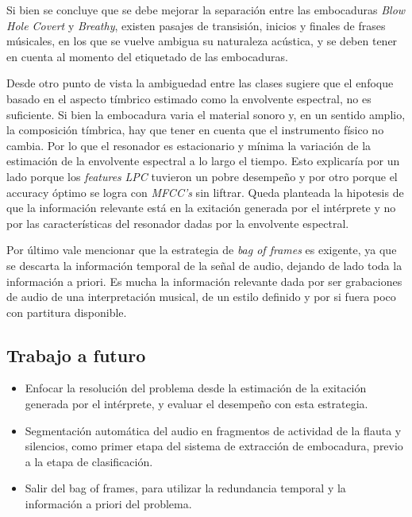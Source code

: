 \documentclass{article}
\begin{document}
Si bien se concluye que se debe mejorar la separación entre las embocaduras \textit{Blow Hole Covert} y \textit{Breathy}, existen pasajes de transisión, inicios y finales de frases músicales, en los que se vuelve ambigua su naturaleza acústica, y se deben tener en cuenta al momento del etiquetado de las embocaduras. 

\medskip

Desde otro punto de vista la ambiguedad entre las clases sugiere que el enfoque basado en el aspecto tímbrico estimado como la envolvente espectral, no es suficiente. Si bien la embocadura varia el material sonoro y, en un sentido amplio, la composición tímbrica, hay que tener en cuenta que el instrumento físico no cambia. Por lo que el resonador es estacionario y mínima la variación de la estimación de la envolvente espectral a lo largo el tiempo. Esto explicaría por un lado porque los \textit{features} \textit{LPC} tuvieron un pobre desempeño y por otro porque el accuracy óptimo se logra con \textit{MFCC's} sin liftrar. Queda planteada la hipotesis de que la información relevante está en la exitación generada por el intérprete y no por las características del resonador dadas por la envolvente espectral.

\medskip

Por último vale mencionar que la estrategia de \textit{bag of frames} es exigente, ya que se descarta la información temporal de la señal de audio, dejando de lado toda la información a priori. Es mucha la información relevante dada por ser grabaciones de audio de una interpretación musical, de un estilo definido y por si fuera poco con partitura disponible. 


\subsection{Trabajo a futuro}

\begin{itemize} 

  \item Enfocar la resolución del problema desde la estimación de la exitación generada por el intérprete, y evaluar el desempeño con esta estrategia.
  
  \item Segmentación automática del audio en fragmentos de actividad de la flauta y silencios, como primer etapa del sistema de extracción de embocadura, previo a la etapa de clasificación.
   
  \item Salir del bag of frames, para utilizar la redundancia temporal y la información a priori del problema.

\end{itemize}
\newpage
\end{document}
